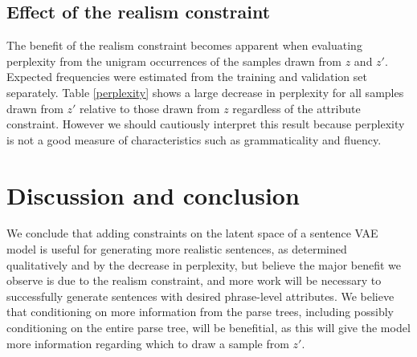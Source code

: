 \documentclass[11pt,letterpaper]{article}
\begin{document}
\subsection{Effect of the realism constraint}

The benefit of the realism constraint becomes apparent when evaluating perplexity from the unigram occurrences of the samples drawn from $z$ and $z'$. Expected frequencies were estimated from the training and validation set separately. Table \ref{perplexity} shows a large decrease in perplexity for all samples drawn from $z'$ relative to those drawn from $z$ regardless of the attribute constraint. However we should cautiously interpret this result because perplexity is not a good measure of characteristics such as grammaticality and fluency. 


\section{Discussion and conclusion}
We conclude that adding constraints on the latent space of a sentence VAE model is useful for generating more realistic sentences, as determined qualitatively and by the decrease in perplexity, but believe the major benefit we observe is due to the realism constraint, and more work will be necessary to successfully generate sentences with desired phrase-level attributes. We believe that conditioning on more information from the parse trees, including possibly conditioning on the entire parse tree, will be benefitial, as this will give the model more information regarding which to draw a sample from $z'$.
\end{document}
